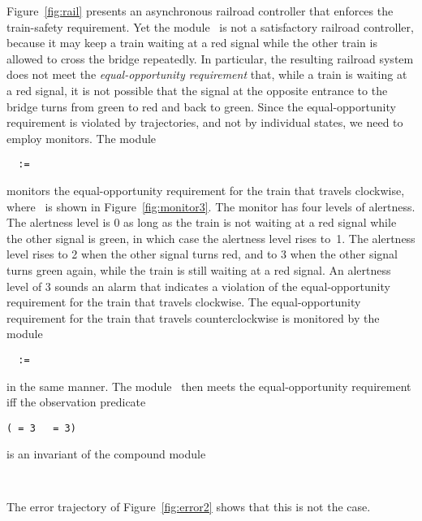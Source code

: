 \mypar
  Figure~\ref{fig:rail} presents an asynchronous railroad controller that 
  enforces the train-safety requirement.
  Yet the module \Controller\ is not a satisfactory railroad controller, 
  because it may keep a train waiting at a red signal while the other train 
  is allowed to cross the bridge repeatedly.
  In particular, the resulting railroad system does not meet the 
  {\em equal-opportunity requirement\/} that, while a train is waiting at a 
  red signal, it is not possible that the signal at the opposite entrance to 
  the bridge turns from green to red and back to green.
  Since the equal-opportunity requirement is violated by trajectories, and 
  not by individual states, we need to employ monitors.
  The module 

\mypar
{\tt
    \EqOppMonitorW\ :=\ \\
    \qu \EqOppMonitor[\level,\pc,\signalo,\signalt :=
      \levelW,\pcW,\signalW,\signalE]
}

\mypar
  monitors the equal-opportunity requirement for the train that travels 
  clockwise, where \EqOppMonitor\ is shown in Figure~\ref{fig:monitor3}.
  The monitor has four levels of alertness.
  The alertness level is 0 as long as the train is not waiting at a red 
  signal while the other signal is green, in which case the alertness level 
  rises to~1.
  The alertness level rises to 2 when the other signal turns red, and to 3
  when the other signal turns green again, while the train is still waiting 
  at a red signal.
  An alertness level of 3 sounds an alarm that indicates a violation of the 
  equal-opportunity requirement for the train that travels clockwise.
  The equal-opportunity requirement for the train that travels 
  counterclockwise is monitored by the module 

\mypar
{\tt
    \EqOppMonitorE\ :=\ \\
    \qu \EqOppMonitor[\level,\pc,\signalo,\signalt :=
      \levelE,\pcE,\signalE,\signalW]
}

\mypar
in the same manner.
The module \Controller\ then meets the equal-opportunity requirement iff 
the observation predicate
\begin{center}
\tt \NOT(\levelW\ = 3 \OR\ \levelE\ = 3)
\end{center}
is an invariant of the compound module
\begin{center}
\tt \TrainSystem\ \pppar\ \EqOppMonitorW\ \pppar\ \EqOppMonitorE
\end{center}
The error trajectory of Figure~\ref{fig:error2} shows that this is not the case.


